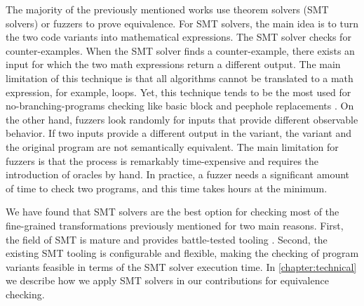 The majority of the previously mentioned works use theorem solvers (SMT solvers) \cite{SMT_solver} or fuzzers \citationneeded to prove equivalence. For SMT solvers, the main idea is to turn the two code variants into mathematical expressions. The SMT solver checks for counter-examples. When the SMT solver finds a counter-example, there exists an input for which the two math expressions return a different output. The main limitation of this technique is that all algorithms cannot be translated to a math expression, for example, loops. Yet, this technique tends to be the most used for no-branching-programs checking like basic block and peephole replacements \citationneeded.
On the other hand, fuzzers look randomly for inputs that provide different observable behavior. If two inputs provide a different output in the variant, the variant and the original program are not semantically equivalent. The main limitation for fuzzers is that the process is remarkably time-expensive and requires the introduction of oracles by hand. In practice,  a fuzzer needs a significant amount of time to check two programs, and this time takes hours at the minimum. 

We have found that SMT solvers are the best option for checking most of the fine-grained transformations previously mentioned for two main reasons. First, the field of SMT is mature and provides battle-tested tooling \cite{SMT_solver, SMTGupta}. Second, the existing SMT tooling is configurable and flexible, making the checking of program variants feasible in terms of the SMT solver execution time. In \autoref{chapter:technical} we describe how we apply SMT solvers in our contributions for equivalence checking.



